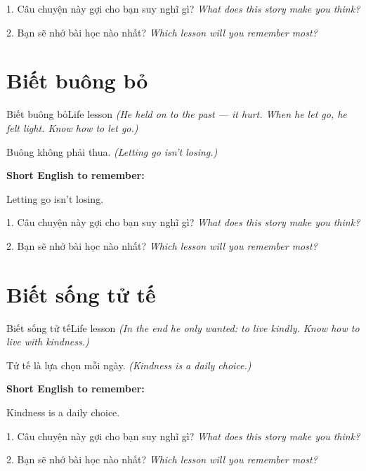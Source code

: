 \begin{tuhocnhanh}
1. Câu chuyện này gợi cho bạn suy nghĩ gì? \textit{What does this story make you think?}

2. Bạn sẽ nhớ bài học nào nhất? \textit{Which lesson will you remember most?}
\end{tuhocnhanh}
\ngancach


\section{Biết buông bỏ}
\begin{truyen}{Biết buông bỏ}{Life lesson}
\textit{(He held on to the past — it hurt. When he let go, he felt light. Know how to let go.)}
\end{truyen}

\begin{baihoc}
Buông không phải thua.
\textit{(Letting go isn't losing.)}
\end{baihoc}

\begin{ghinhoanh}
\textbf{Short English to remember:}

Letting go isn't losing.

\end{ghinhoanh}

\begin{tuhocnhanh}
1. Câu chuyện này gợi cho bạn suy nghĩ gì? \textit{What does this story make you think?}

2. Bạn sẽ nhớ bài học nào nhất? \textit{Which lesson will you remember most?}
\end{tuhocnhanh}
\ngancach


\section{Biết sống tử tế}
\begin{truyen}{Biết sống tử tế}{Life lesson}
\textit{(In the end he only wanted: to live kindly. Know how to live with kindness.)}
\end{truyen}

\begin{baihoc}
Tử tế là lựa chọn mỗi ngày.
\textit{(Kindness is a daily choice.)}
\end{baihoc}

\begin{ghinhoanh}
\textbf{Short English to remember:}

Kindness is a daily choice.

\end{ghinhoanh}

\begin{tuhocnhanh}
1. Câu chuyện này gợi cho bạn suy nghĩ gì? \textit{What does this story make you think?}

2. Bạn sẽ nhớ bài học nào nhất? \textit{Which lesson will you remember most?}
\end{tuhocnhanh}
\ngancach
